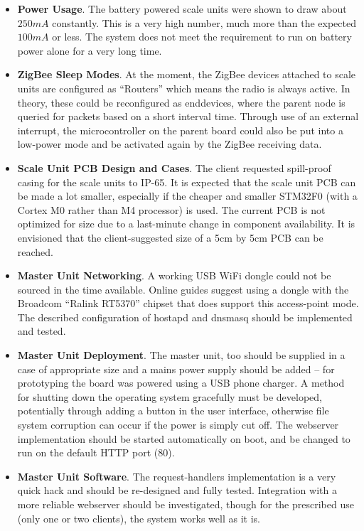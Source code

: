 \begin{itemize}
	\item \textbf{Power Usage}. The battery powered scale units were shown to draw about $250\unit{mA}$ constantly. This is a very high number, much more than the expected $100\unit{mA}$ or less. The system does not meet the requirement to run on battery power alone for a very long time.
	\item \textbf{ZigBee Sleep Modes}. At the moment, the ZigBee devices attached to scale units are configured as ``Routers'' which means the radio is always active. In theory, these could be reconfigured as enddevices, where the parent node is queried for packets based on a short interval time. Through use of an external interrupt, the microcontroller on the parent board could also be put into a low-power mode and be activated again by the ZigBee receiving data.
	\item \textbf{Scale Unit PCB Design and Cases}. The client requested spill-proof casing for the scale units to IP-65\cite{ip-standards}. It is expected that the scale unit PCB can be made a lot smaller, especially if the cheaper and smaller STM32F0 (with a Cortex M0 rather than M4 processor) is used. The current PCB is not optimized for size due to a last-minute change in component availability. It is envisioned that the client-suggested size of a 5cm by 5cm PCB can be reached.
		\item \textbf{Master Unit Networking}. A working USB WiFi dongle could not be sourced in the time available. Online guides \cite{pi-wifi-dongles} suggest using a dongle with the Broadcom ``Ralink RT5370'' chipset that does support this access-point mode. The described configuration of hostapd and dnsmasq should be implemented and tested.
   	\item \textbf{Master Unit Deployment}. The master unit, too should be supplied in a case of appropriate size and a mains power supply should be added -- for prototyping the board was powered using a USB phone charger. A method for shutting down the operating system gracefully must be developed, potentially through adding a button in the user interface, otherwise file system corruption can occur if the power is simply cut off. The webserver implementation should be started automatically on boot, and be changed to run on the default HTTP port (80).
	\item \textbf{Master Unit Software}. The request-handlers implementation is a very quick hack and should be re-designed and fully tested. Integration with a more reliable webserver should be investigated, though for the prescribed use (only one or two clients), the system works well as it is.

\end{itemize}

